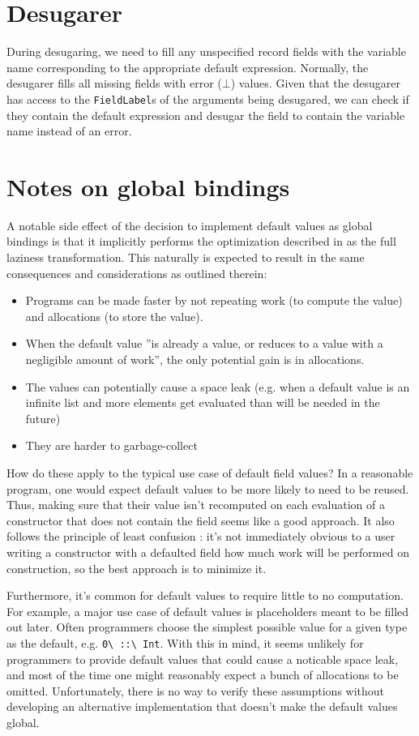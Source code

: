 \documentclass[en]{pracamgr}
\newcommand{\code}[1]{\lstinline[breaklines=true]{#1}}
\begin{document}
\section{Desugarer}
During desugaring, we need to fill any unspecified record fields with the variable name corresponding to the appropriate default expression.
Normally, the desugarer fills all missing fields with error ($\bot$) values.
Given that the desugarer has access to the \code{FieldLabel}s of the arguments being desugared, we can check if they contain the default expression and desugar the field to contain the variable name instead of an error.

\section{Notes on global bindings}
\label{sec:efficiency}
A notable side effect of the decision to implement default values as global bindings is that it implicitly performs the optimization
described in \cite{partain1996let-floating} as the full laziness transformation. 
This naturally is expected to result in the same consequences and considerations as outlined therein:
\begin{itemize}
  \item Programs can be made faster by not repeating work (to compute the value) and allocations (to store the value).
  \item When the default value ''is already a value, or reduces to a value with a negligible amount of work'', the only potential gain is in allocations.
  \item The values can potentially cause a space leak 
    (e.g. when a default value is an infinite list and more elements get evaluated than will be needed in the future)
  \item They are harder to garbage-collect
\end{itemize}
How do these apply to the typical use case of default field values?
In a reasonable program, one would expect default values to be more likely to need to be reused.
Thus, making sure that their value isn't recomputed on each evaluation of a constructor that does not contain the field seems like a good approach.
It also follows the principle of least confusion \cite{saltzer2009principles}: 
it's not immediately obvious to a user writing a constructor with a defaulted field how much work will be performed on construction,
so the best approach is to minimize it.

Furthermore, it's common for default values to require little to no computation. 
For example, a major use case of default values is placeholders meant to be filled out later. 
Often programmers choose the simplest possible value for a given type as the default, e.g. \code{0\ ::\ Int}.
With this in mind, it seems unlikely for programmers to provide default values that could cause a noticable space leak, and most of the time one might
reasonably expect a bunch of allocations to be omitted.
Unfortunately, there is no way to verify these assumptions without developing an alternative implementation that doesn't make the default values global.
\end{document}

